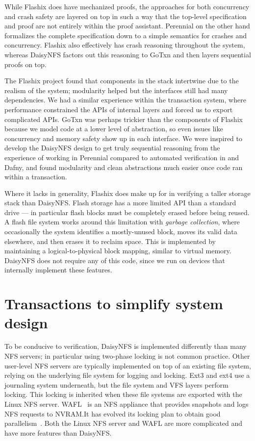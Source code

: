 While Flashix does have mechanized proofs, the approaches for both concurrency
and crash safety are layered on top in such a way that the top-level
specification and proof are not entirely within the proof assistant. Perennial
on the other hand formalizes the complete specification down to a simple
semantics for crashes and concurrency. Flashix also effectively has crash
reasoning throughout the system, whereas DaisyNFS factors out this reasoning to
GoTxn and then layers sequential proofs on top.

The Flashix project found that components in the stack intertwine due to the
realism of the system; modularity helped but the interfaces still had many
dependencies. We had a similar experience within the transaction system, where
performance constrained the APIs of internal layers and forced us to export
complicated APIs. GoTxn was perhaps trickier than the components of Flashix
because we model code at a lower level of abstraction, so even issues like
concurrency and memory safety show up in each interface. We were inspired to
develop the DaisyNFS design to get truly sequential reasoning from the
experience of working in Perennial compared to automated verification in \fstar
and Dafny, and found modularity and clean abstractions much easier once
code ran within a transaction.

Where it lacks in generality, Flashix does make up for in verifying a taller
storage stack than DaisyNFS. Flash storage has a more limited API than a
standard drive --- in particular flash blocks must be completely erased before
being reused. A flash file system works around this limitation with \emph{garbage
collection}, where occasionally the system identifies a mostly-unused block,
moves its valid data elsewhere, and then erases it to reclaim space. This is
implemented by maintaining a logical-to-physical block mapping, similar to
virtual memory. DaisyNFS does not require any of this code, since we run on
devices that internally implement these features.


\section{Transactions to simplify system design}
\label{sec:rel:txn}

To be conducive to verification, DaisyNFS is implemented differently than
many NFS servers; in particular using two-phase locking is not common
practice.  Other user-level NFS servers are typically implemented on
top of an existing file system, relying on the underlying file system
for logging and locking. Ext3 and ext4 use a journaling system underneath, but
the file system and VFS layers perform locking. This locking is inherited when
these file systems are exported with the Linux NFS server. WAFL~\cite{wafl:hitz}
is an NFS appliance that provides snapshots and logs NFS requests to
NVRAM.\@  It has evolved its locking plan to obtain good
parallelism~\cite{curtis:wafl}.  Both the Linux NFS server and WAFL
are more complicated and have more features than DaisyNFS.\@

